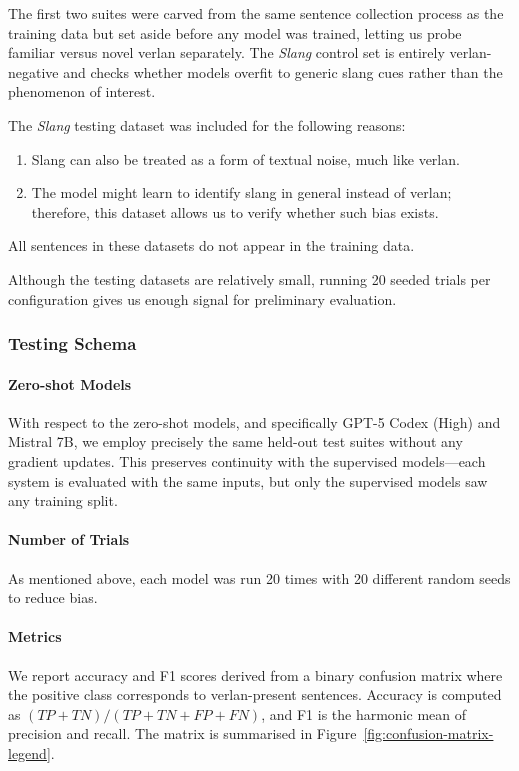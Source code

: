 \documentclass[12pt]{article}
\begin{document}
The first two suites were carved from the same sentence collection process as the training data but set aside before any model was trained, letting us probe familiar versus novel verlan separately. The \textit{Slang} control set is entirely verlan-negative and checks whether models overfit to generic slang cues rather than the phenomenon of interest.

The \textit{Slang} testing dataset was included for the following reasons:
\begin{enumerate}
  \item Slang can also be treated as a form of textual noise, much like verlan.
  \item The model might learn to identify slang in general instead of verlan; therefore, this dataset allows us to verify whether such bias exists.
\end{enumerate}

All sentences in these datasets do not appear in the training data.
 
Although the testing datasets are relatively small, running 20 seeded trials per configuration gives us enough signal for preliminary evaluation.

\subsubsection{Testing Schema}

\paragraph{Zero-shot Models}
With respect to the zero-shot models, and specifically GPT-5 Codex (High) and Mistral 7B, we employ precisely the same held-out test suites without any gradient updates. This preserves continuity with the supervised models—each system is evaluated with the same inputs, but only the supervised models saw any training split.

\paragraph{Number of Trials}
As mentioned above, each model was run 20 times with 20 different random seeds to reduce bias.

\paragraph{Metrics}
We report accuracy and F1 scores derived from a binary confusion matrix where the positive class corresponds to verlan-present sentences. Accuracy is computed as $(TP + TN)/(TP + TN + FP + FN)$, and F1 is the harmonic mean of precision and recall. The matrix is summarised in Figure~\ref{fig:confusion-matrix-legend}.
\end{document}
